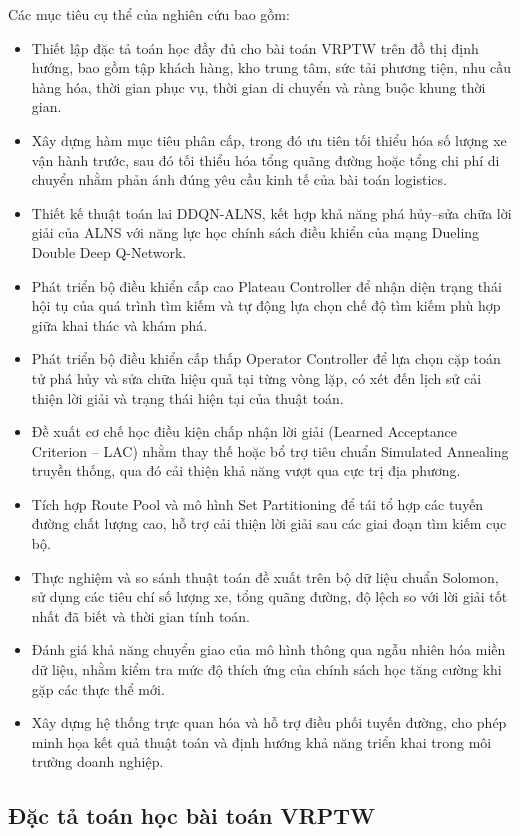 \documentclass[13pt,a4paper]{extarticle}
\begin{document}
Các mục tiêu cụ thể của nghiên cứu bao gồm:
\begin{itemize}[leftmargin=1.2cm]
  \item Thiết lập đặc tả toán học đầy đủ cho bài toán VRPTW trên đồ thị định hướng, bao gồm tập khách hàng, kho trung tâm, sức tải phương tiện, nhu cầu hàng hóa, thời gian phục vụ, thời gian di chuyển và ràng buộc khung thời gian.
  \item Xây dựng hàm mục tiêu phân cấp, trong đó ưu tiên tối thiểu hóa số lượng xe vận hành trước, sau đó tối thiểu hóa tổng quãng đường hoặc tổng chi phí di chuyển nhằm phản ánh đúng yêu cầu kinh tế của bài toán logistics.
  \item Thiết kế thuật toán lai DDQN-ALNS, kết hợp khả năng phá hủy--sửa chữa lời giải của ALNS với năng lực học chính sách điều khiển của mạng Dueling Double Deep Q-Network.
  \item Phát triển bộ điều khiển cấp cao Plateau Controller để nhận diện trạng thái hội tụ của quá trình tìm kiếm và tự động lựa chọn chế độ tìm kiếm phù hợp giữa khai thác và khám phá.
  \item Phát triển bộ điều khiển cấp thấp Operator Controller để lựa chọn cặp toán tử phá hủy và sửa chữa hiệu quả tại từng vòng lặp, có xét đến lịch sử cải thiện lời giải và trạng thái hiện tại của thuật toán.
  \item Đề xuất cơ chế học điều kiện chấp nhận lời giải (Learned Acceptance Criterion -- LAC) nhằm thay thế hoặc bổ trợ tiêu chuẩn Simulated Annealing truyền thống, qua đó cải thiện khả năng vượt qua cực trị địa phương.
  \item Tích hợp Route Pool và mô hình Set Partitioning để tái tổ hợp các tuyến đường chất lượng cao, hỗ trợ cải thiện lời giải sau các giai đoạn tìm kiếm cục bộ.
  \item Thực nghiệm và so sánh thuật toán đề xuất trên bộ dữ liệu chuẩn Solomon, sử dụng các tiêu chí số lượng xe, tổng quãng đường, độ lệch so với lời giải tốt nhất đã biết và thời gian tính toán.
  \item Đánh giá khả năng chuyển giao của mô hình thông qua ngẫu nhiên hóa miền dữ liệu, nhằm kiểm tra mức độ thích ứng của chính sách học tăng cường khi gặp các thực thể mới.
  \item Xây dựng hệ thống trực quan hóa và hỗ trợ điều phối tuyến đường, cho phép minh họa kết quả thuật toán và định hướng khả năng triển khai trong môi trường doanh nghiệp.
\end{itemize}

\subsection{Đặc tả toán học bài toán VRPTW}
\end{document}
